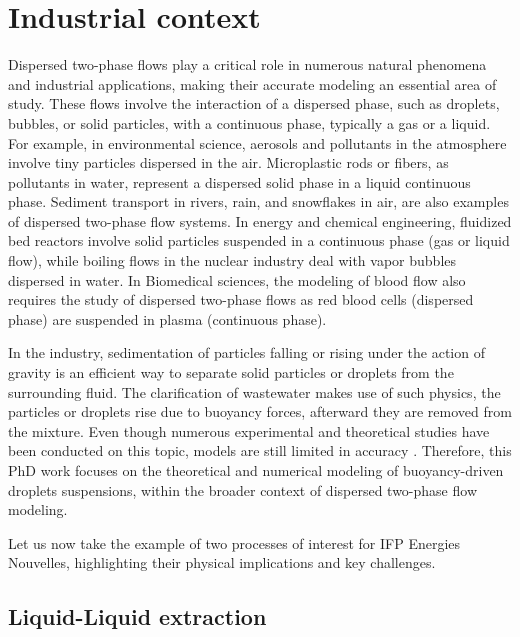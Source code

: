 \section{Industrial context}

Dispersed two-phase flows play a critical role in numerous natural phenomena and industrial applications, making their accurate modeling an essential area of study.
These flows involve the interaction of a dispersed phase, such as droplets, bubbles, or solid particles, with a continuous phase, typically a gas or a liquid. 
For example, in environmental science, aerosols and pollutants in the atmosphere involve tiny particles dispersed in the air. 
Microplastic rods or fibers, as pollutants in water, represent a dispersed solid phase in a liquid continuous phase. 
Sediment transport in rivers, rain, and snowflakes in air, are also examples of dispersed two-phase flow systems. 
In energy and chemical engineering, fluidized bed reactors involve solid particles suspended in a continuous phase (gas or liquid flow),  while boiling flows in the nuclear industry deal with vapor bubbles dispersed in water. 
In Biomedical sciences, the modeling of blood flow also requires the study of dispersed two-phase flows as red blood cells (dispersed phase) are suspended in plasma (continuous phase). 

In the industry, sedimentation of particles falling or rising under the action of gravity is an efficient way to separate solid particles or droplets from the surrounding fluid. 
The clarification of wastewater makes use of such physics, the particles or droplets rise due to buoyancy forces, afterward they are removed from the mixture.
Even though numerous experimental and theoretical studies have been conducted on this topic, models are still limited in accuracy
 \citep{paisant2014modelisation,gemello2018modelling}. 
Therefore, this PhD work focuses on the theoretical and numerical modeling of buoyancy-driven droplets suspensions,  within the broader context of dispersed two-phase flow modeling.  

Let us now take the example of two processes of interest for IFP Energies Nouvelles, highlighting their physical implications and key challenges.  


\subsection{Liquid-Liquid extraction}



